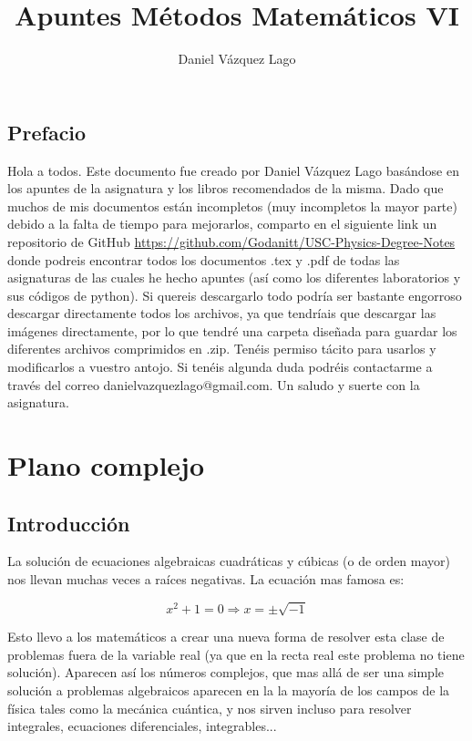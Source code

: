 \documentclass[12pt]{book}
\author{Daniel Vázquez Lago}
\title{Apuntes Métodos Matemáticos VI}
\begin{document}
\maketitle

\newpage

\tableofcontents

\newpage


\newpage

\section*{Prefacio}

Hola a todos. Este documento fue creado por Daniel Vázquez Lago basándose en los apuntes de la asignatura y los libros recomendados de la misma. Dado que muchos de mis documentos están incompletos (muy incompletos la mayor parte) debido a la falta de tiempo para mejorarlos, comparto en el siguiente link un repositorio de GitHub \url{https://github.com/Godanitt/USC-Physics-Degree-Notes} donde podreis encontrar todos los documentos .tex y .pdf de todas las asignaturas de las cuales he hecho apuntes (así como los diferentes laboratorios y sus códigos de python). Si quereis descargarlo todo podría ser bastante engorroso descargar directamente todos los archivos, ya que tendríais que descargar las imágenes directamente, por lo que tendré una carpeta diseñada para guardar los diferentes archivos comprimidos en .zip. Tenéis permiso tácito para usarlos y modificarlos a vuestro antojo. Si tenéis algunda duda podréis contactarme a través del correo danielvazquezlago@gmail.com. Un saludo y suerte con la asignatura.


\chapter{Plano complejo}

\section{Introducción}

La solución de ecuaciones algebraicas cuadráticas y cúbicas (o de orden mayor) nos llevan muchas veces a raíces negativas. La ecuación mas famosa es:

$$ x^2 + 1 = 0 \Longrightarrow x= \pm \sqrt{-1} $$

Esto llevo a los matemáticos a crear una nueva forma de resolver esta clase de problemas fuera de la variable real (ya que en la recta real este problema no tiene solución). Aparecen así los números complejos, que mas allá de ser una simple solución a problemas algebraicos aparecen en la la mayoría de los campos de la física tales como la mecánica cuántica, y nos sirven incluso para resolver integrales, ecuaciones diferenciales, integrables... 
\end{document}
